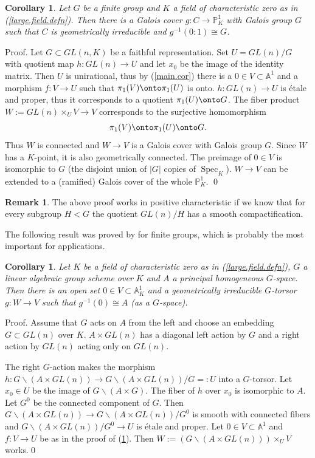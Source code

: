 \documentclass[12pt,twoside]{amsart}
\renewcommand{\a}[0]{{\mathbb A}}
\newcommand{\p}[0]{{\mathbb P}}
\newcommand{\spec}[0]{\operatorname{Spec}}
\newtheorem{cor}[thm]{Corollary}
\theoremstyle{definition}
\newtheorem{rem}[thm]{Remark}
\theoremstyle{remark}
\begin{document}
\begin{cor}\cite{harb}\label{harb.cor}
 Let $G$ be a finite group and $K$  a   field of characteristic zero
 as in (\ref{large.field.defn}). Then there
  is a  Galois cover $g:C\to \p^1_K$ with Galois group $G$
such that $C$ is geometrically irreducible and 
 $g^{-1}(0{\colon\!} 1)\cong G$.
\end{cor}

Proof. Let $G\subset GL(n,K)$ be a faithful representation.
Set $U=GL(n)/G$ with 
quotient map $h:GL(n)\to U$ and let 
$x_0$ be the image of the
identity matrix. Then $U$ is unirational, thus by
(\ref{main.cor}) there is a $0\in V\subset \a^1$
and a morphism $f:V\to U$ such that $\pi_1 (V)\onto\pi_1 (U)$
is onto. $h:GL(n)\to U$ is  \'etale and proper, thus it corresponds to a
quotient  $\pi_1 (U)\onto G$. 
 The fiber product
$W:=GL(n)\times_U V\to V$  corresponds to the surjective homomorphism 
$$
\pi_1 (V)\onto\pi_1 (U)\onto G.
$$
Thus $W$  is connected and 
 $W\to V$ is a Galois cover with Galois group $G$.
 Since $W$ has a $K$-point, it is also geometrically connected.
 The preimage of $0\in V$ is  isomorphic to $G$
 (the disjoint union of $|G|$ copies of $\spec_K$).
$W\to V$ can be extended to a (ramified) 
Galois cover of the whole $\p^1_K$. 
\qed

\begin{rem} The above proof works in positive characteristic
if we know that for every subgroup $H<G$ the quotient
$GL(n)/H$ has a smooth compactification.
\end{rem}

The following result was proved by \cite{ct-harb} for
finite groups, which is probably the most important for applications.



\begin{cor}\label{tors.gen.cor}
 Let $K$ be a field of characteristic zero as in (\ref{large.field.defn}),
$G$  a linear algebraic group scheme over $K$ and  $A$  a
principal homogeneous $G$-space.
 Then there is an open set
$0\in V\subset \a^1_K$ and a geometrically irreducible
$G$-torsor $g:W\to V$ such that $g^{-1}(0)\cong A$
(as a $G$-space).
\end{cor}

Proof. Assume that $G$ acts on $A$ from the left
and choose an embedding $G\subset GL(n)$ over $K$.
 $A\times GL(n)$ has a diagonal left action by $G$
and a right action by $GL(n)$ acting only on $GL(n)$. 

The right $G$-action makes the morphism
 $h:  G\backslash(A\times GL(n))\to 
 G\backslash(A\times GL(n))/G=:U$ into a $G$-torsor.
Let $x_0\in U$ be the image of $G\backslash(A\times G)$. 
The fiber of $h$ over $x_0$ is isomorphic to
$A$. Let $G^0$ be the connected component of $G$. 
Then $G\backslash(A\times GL(n))\to G\backslash(A\times GL(n))/G^0$
is smooth with connected fibers
and $G\backslash(A\times GL(n))/G^0\to U$ is \'etale and proper.
Let $0\in V\subset \a^1$  
and $f:V\to U$ be as in the proof of (\ref{harb.cor}).
Then  $W:=(G\backslash(A\times GL(n)))\times_UV$ works.\qed
\end{document}
